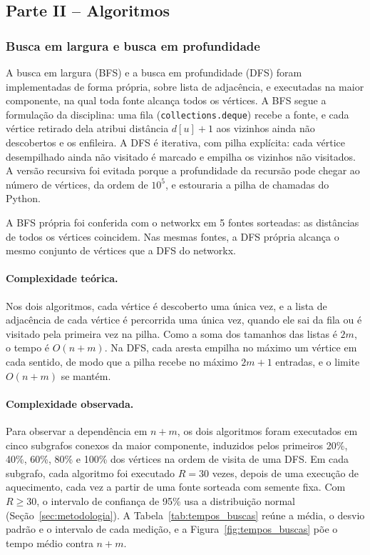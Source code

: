 \subsection{Parte II -- Algoritmos}
\label{sec:parte2}

\subsubsection{Busca em largura e busca em profundidade}

A busca em largura (BFS) e a busca em profundidade (DFS) foram implementadas de forma própria, sobre lista de adjacência, e executadas na maior componente, na qual toda fonte alcança todos os vértices. A BFS segue a formulação da disciplina: uma fila (\texttt{collections.deque}) recebe a fonte, e cada vértice retirado dela atribui distância $d[u] + 1$ aos vizinhos ainda não descobertos e os enfileira. A DFS é iterativa, com pilha explícita: cada vértice desempilhado ainda não visitado é marcado e empilha os vizinhos não visitados. A versão recursiva foi evitada porque a profundidade da recursão pode chegar ao número de vértices, da ordem de $10^5$, e estouraria a pilha de chamadas do Python.

A BFS própria foi conferida com o networkx em 5 fontes sorteadas: as distâncias de todos os vértices coincidem. Nas mesmas fontes, a DFS própria alcança o mesmo conjunto de vértices que a DFS do networkx.

\paragraph{Complexidade teórica.} Nos dois algoritmos, cada vértice é descoberto uma única vez, e a lista de adjacência de cada vértice é percorrida uma única vez, quando ele sai da fila ou é visitado pela primeira vez na pilha. Como a soma dos tamanhos das listas é $2m$, o tempo é $O(n + m)$. Na DFS, cada aresta empilha no máximo um vértice em cada sentido, de modo que a pilha recebe no máximo $2m + 1$ entradas, e o limite $O(n + m)$ se mantém.

\paragraph{Complexidade observada.} Para observar a dependência em $n + m$, os dois algoritmos foram executados em cinco subgrafos conexos da maior componente, induzidos pelos primeiros 20\%, 40\%, 60\%, 80\% e 100\% dos vértices na ordem de visita de uma DFS. Em cada subgrafo, cada algoritmo foi executado $R = 30$ vezes, depois de uma execução de aquecimento, cada vez a partir de uma fonte sorteada com semente fixa. Com $R \geq 30$, o intervalo de confiança de 95\% usa a distribuição normal (Seção~\ref{sec:metodologia}). A Tabela~\ref{tab:tempos_buscas} reúne a média, o desvio padrão e o intervalo de cada medição, e a Figura~\ref{fig:tempos_buscas} põe o tempo médio contra $n + m$.

